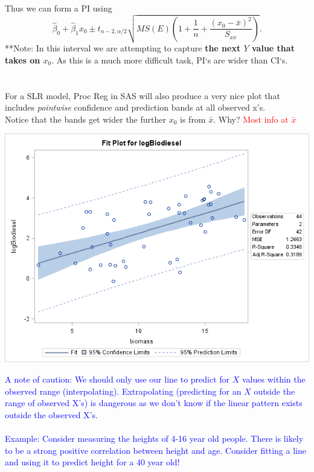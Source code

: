 Thus we can form a PI using
$$\hat\beta_0 +\hat\beta_1 x_0 \pm t_{n-2,\alpha/2} \sqrt{MS(E)\left(1+\frac{1}{n}+\frac{(x_0-\bar{x})^2}{S_{xx}}\right)}. $$
**Note: In this interval we are attempting to capture \textbf{the next $Y$ value that takes on $x_0$}.  As this is a much more difficult task, PI`s are wider than CI`s.  \\~\\~\\

For a SLR model, Proc Reg in SAS will also produce a very nice plot that includes \textit{pointwise} confidence and prediction bands at all observed x's. \\
Notice that the bands get wider the further $x_0$ is from $\bar{x}$.  Why? \textcolor{red}{Most info at $\bar{x}$}

\begin{flushleft}
\includegraphics[scale=0.6]{biofitpred}
\end{flushleft}

\textcolor{blue}{A note of caution: We should only use our line to predict for $X$ values within the observed range (interpolating).  Extrapolating (predicting for an $X$ outside the range of observed X's) is dangerous as we don't know if the linear pattern exists outside the observed X's.\\~\\
Example: Consider measuring the heights of 4-16 year old people.  There is likely to be a strong positive correlation between height and age.  Consider fitting a line and using it to predict height for a 40 year old!}


